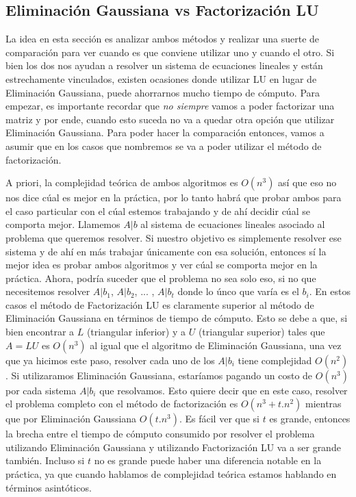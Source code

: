 \subsection{Eliminación Gaussiana vs Factorización LU}
La idea en esta sección es analizar ambos métodos y realizar una suerte de comparación para ver cuando es que conviene utilizar uno y cuando el otro. Si bien los dos nos ayudan a resolver un sistema de ecuaciones lineales y están estrechamente vinculados, existen ocasiones donde utilizar LU en lugar de Eliminación Gaussiana, puede ahorrarnos mucho tiempo de cómputo. Para empezar, es importante recordar que \textit{no siempre} vamos a poder factorizar una matriz y por ende, cuando esto suceda no va a quedar otra opción que utilizar Eliminación Gaussiana. Para poder hacer la comparación entonces, vamos a asumir que en los casos que nombremos se va a poder utilizar el método de factorización.
\par A priori, la complejidad teórica de ambos algoritmos es $O(n^3)$ así que eso no nos dice cúal es mejor en la práctica, por lo tanto habrá que probar ambos para el caso particular con el cúal estemos trabajando y de ahí decidir cúal se comporta mejor. Llamemos $A|b$ al sistema de ecuaciones lineales asociado al problema que queremos resolver. Si nuestro objetivo es simplemente resolver ese sistema y de ahí en más trabajar únicamente con esa solución, entonces sí la mejor idea es probar ambos algoritmos y ver cúal se comporta mejor en la práctica. Ahora, podría suceder que el problema no sea solo eso, si no que necesitemos resolver $A|b_1$, $A|b_2$, ... , $A|b_t$ donde lo únco que varía es el $b_i$. En estos casos el método de Factorización LU es claramente superior al método de Eliminación Gaussiana en términos de tiempo de cómputo. Esto se debe a que, si bien encontrar a $L$ (triangular inferior) y a $U$ (triangular superior) tales que $A = LU$ es $O(n^3)$ al igual que el algoritmo de Eliminación Gaussiana, una vez que ya hicimos este paso, resolver cada uno de los $A|b_i$ tiene complejidad $O(n^2)$. Si utilizaramos Eliminación Gaussiana, estaríamos pagando un costo de $O(n^3)$ por cada sistema $A|b_i$ que resolvamos. Esto quiere decir que en este caso, resolver el problema completo con el método de factorización es $O(n^3 + t.n^2)$ mientras que por Eliminación Gaussiana $O(t.n^3)$. Es fácil ver que si $t$ es grande, entonces la brecha entre el tiempo de cómputo consumido por resolver el problema utilizando Eliminación Gaussiana y utilizando Factorización LU va a ser grande también. Incluso si $t$ no es grande puede haber una diferencia notable en la práctica, ya que cuando hablamos de complejidad teórica estamos hablando en términos asintóticos.

